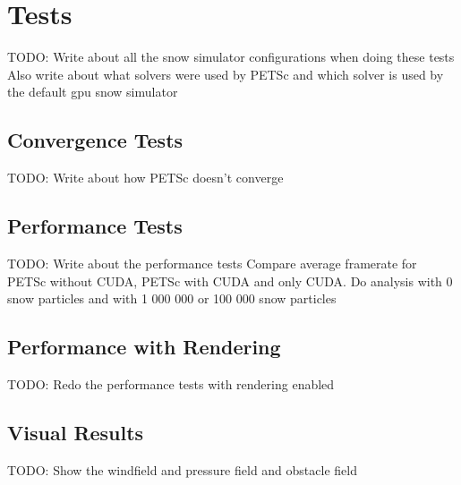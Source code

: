 \section{Tests}

TODO: Write about all the snow simulator configurations when doing these tests
Also write about what solvers were used by PETSc and which solver is used
by the default gpu snow simulator

\subsection{Convergence Tests}

TODO: Write about how PETSc doesn't converge

\subsection{Performance Tests}

TODO: Write about the performance tests
Compare average framerate for PETSc without CUDA, PETSc with CUDA and only CUDA.
Do analysis with 0 snow particles and with 1 000 000 or 100 000 snow particles 

\subsection{Performance with Rendering}

TODO: Redo the performance tests with rendering enabled

\subsection{Visual Results}

TODO: Show the windfield and pressure field and obstacle field
